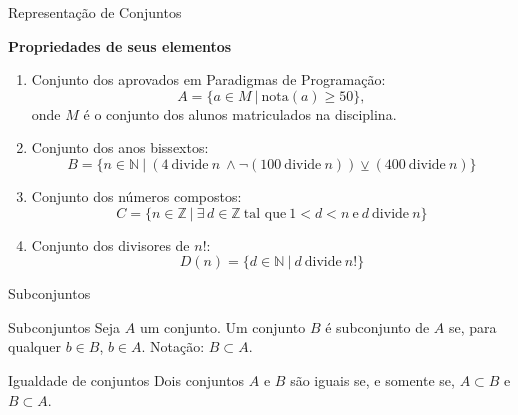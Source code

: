 \begin{frame}[fragile]{Representação de Conjuntos}

    \textbf{Propriedades de seus elementos}

    \vspace{0.1in}

    \begin{enumerate}

        \item Conjunto dos aprovados em Paradigmas de Programação:
        \[
            A = \lbrace a\in M\ |\ \mathrm{nota}(a) \geq 50 \rbrace,
        \]
        onde $M$ é o conjunto dos alunos matriculados na disciplina.

        \item Conjunto dos anos bissextos:
        \[
            B = \lbrace n\in\mathbb{N}\ |\ (4\ \mbox{divide}\ n\ \land \lnot(100\ \mbox{divide}\ 
            n)) \veebar (400\ \mbox{divide}\ n)\rbrace
        \]

        \item Conjunto dos números compostos:
        \[
            C = \lbrace n\in \mathbb{Z}\ |\ \exists\, d\in \mathbb{Z}\ \mbox{tal que}\ 1 < d < n\
                \mbox{e}\ d\ \mbox{divide}\ n\rbrace
        \]

        \item Conjunto dos divisores de $n!$:
        \[
            D(n) = \lbrace d\in \mathbb{N}\ |\ d\ \mbox{divide}\ n!\rbrace
        \]
    \end{enumerate}

\end{frame}

\begin{frame}[fragile]{Subconjuntos}

    \begin{block}{Subconjuntos}
        Seja $A$ um conjunto. Um conjunto $B$ é subconjunto de $A$ se, para qualquer $b\in B$, 
            $b\in A$. Notação: $B\subset A$.
    \end{block}

    \vspace{0.1in}

    \begin{block}{Igualdade de conjuntos}
       Dois conjuntos $A$ e $B$ são iguais se, e somente se, $A\subset B$ e $B\subset A$.
    \end{block}

\end{frame}

